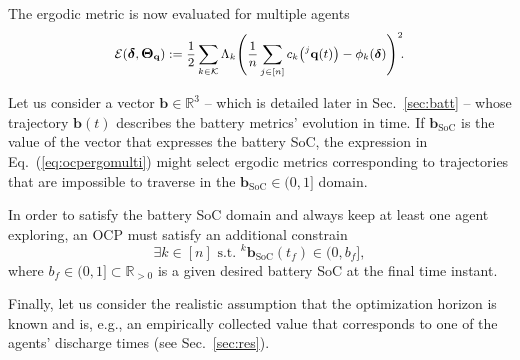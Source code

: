 \documentclass[letterpaper,10pt,conference,twoside]{IEEEtran}
\theoremstyle{definition}
\begin{document}
The ergodic metric is now evaluated for multiple agents\vspace*{-.1cm}
\begin{equation}\label{eq:multiergometric}
  \mathcal{E}(\boldsymbol{\delta},\boldsymbol{\Theta}_{\mathbf{q}}):={\small
  \frac{1}{2}
  \sum_{k\in\mathcal{K}}\Lambda_k 
    \Bigg(
      \frac{1}{n}\sum_{j\in[n]} c_k\big({}^j\mathbf{q}(t)\big)-\phi_k(\boldsymbol{\delta})
    \Bigg)^2\hspace*{-.5ex}.}
\end{equation}
\vspace*{-.2cm}

Let us consider a vector $\mathbf{b}\in\mathbb{R}^3$ -- which is detailed later in Sec.~\ref{sec:batt} -- whose trajectory $\mathbf{b}(t)$ describes the battery metrics' evolution in time. If $\mathbf{b}_{\text{SoC}}$ is the value of the vector that expresses the battery %
SoC, the expression in Eq.~(\ref{eq:ocpergomulti}) might select ergodic metrics corresponding to trajectories that are impossible to traverse in the $\mathbf{b}_{\text{SoC}}\in(0,1]$ domain.%

In order to satisfy the battery SoC domain and always keep at least one agent exploring, an OCP must satisfy an additional constrain
\begin{equation}\label{eq:ocpbattconst}
  \exists k\in[n]\text{ s.t. }{}^k\mathbf{b}_{\text{SoC}}(t_f)\in(0,b_f],
\end{equation}
where $b_f\in(0,1]\subset\mathbb{R}_{>0}$ is a given desired battery SoC at the final time instant.

Finally, let us consider the realistic assumption that the optimization horizon %
is known and is,
e.g., an empirically collected value that corresponds to one of the agents' discharge times (see Sec.~\ref{sec:res}).
\end{document}
